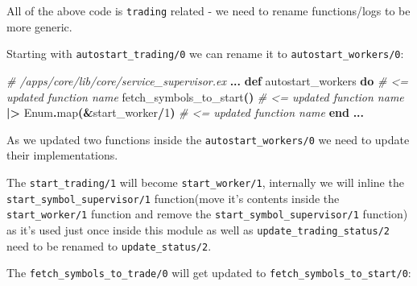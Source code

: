 \documentclass[
  oneside]{book}
\newenvironment{Shaded}{\begin{snugshade}}{\end{snugshade}}
\newcommand{\CommentTok}[1]{\textcolor[rgb]{0.56,0.35,0.01}{\textit{#1}}}
\newcommand{\ConstantTok}[1]{\textcolor[rgb]{0.56,0.35,0.01}{#1}}
\newcommand{\DecValTok}[1]{\textcolor[rgb]{0.00,0.00,0.81}{#1}}
\newcommand{\FunctionTok}[1]{\textcolor[rgb]{0.13,0.29,0.53}{\textbf{#1}}}
\newcommand{\KeywordTok}[1]{\textcolor[rgb]{0.13,0.29,0.53}{\textbf{#1}}}
\newcommand{\NormalTok}[1]{#1}
\newcommand{\OperatorTok}[1]{\textcolor[rgb]{0.81,0.36,0.00}{\textbf{#1}}}
\begin{document}
All of the above code is \texttt{trading} related - we need to rename functions/logs to be more generic.

Starting with \texttt{autostart\_trading/0} we can rename it to \texttt{autostart\_workers/0}:

\begin{Shaded}
\begin{Highlighting}[]
  \CommentTok{\# /apps/core/lib/core/service\_supervisor.ex}
  \OperatorTok{...}
  \KeywordTok{def}\NormalTok{ autostart\_workers }\KeywordTok{do}       \CommentTok{\# \textless{}= updated function name}
\NormalTok{    fetch\_symbols\_to\_start}\FunctionTok{()}     \CommentTok{\# \textless{}= updated function name}
    \OperatorTok{|\textgreater{}} \ConstantTok{Enum}\OperatorTok{.}\NormalTok{map}\FunctionTok{(}\OperatorTok{\&}\NormalTok{start\_worker}\OperatorTok{/}\DecValTok{1}\FunctionTok{)} \CommentTok{\# \textless{}= updated function name}
  \KeywordTok{end}
  \OperatorTok{...}
\end{Highlighting}
\end{Shaded}

As we updated two functions inside the \texttt{autostart\_workers/0} we need to update their implementations.

The \texttt{start\_trading/1} will become \texttt{start\_worker/1}, internally we will inline the\\
\texttt{start\_symbol\_supervisor/1} function(move it's contents inside the \texttt{start\_worker/1} function and remove the \texttt{start\_symbol\_supervisor/1} function) as it's used just once inside this module as well as \texttt{update\_trading\_status/2} need to be renamed to \texttt{update\_status/2}.

The \texttt{fetch\_symbols\_to\_trade/0} will get updated to \texttt{fetch\_symbols\_to\_start/0}:
\end{document}
